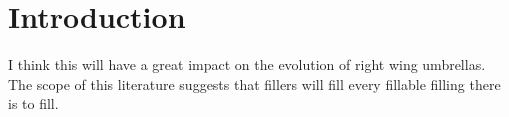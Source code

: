 \section{Introduction}

I think this will have a great impact on the evolution of right wing umbrellas. The scope of this literature suggests
that fillers will fill every fillable filling there is to fill.